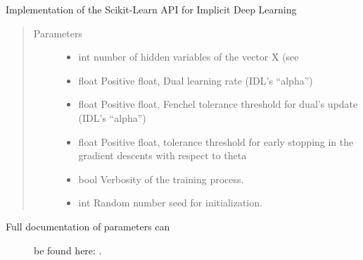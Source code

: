 \documentclass[letterpaper,10pt,english]{sphinxmanual}
\begin{document}
\begin{fulllineitems}
\label{\detokenize{sections/prediction:IDL.IDLModel}}
Implementation of the Scikit-Learn API for Implicit Deep Learning
\begin{quote}\begin{description}
\item[{Parameters}] \leavevmode\begin{itemize}
\item {} 
 \textendash{} int
number of hidden variables of the vector X (see

\item {} 
 \textendash{} float
Positive float, Dual learning rate (IDL’s “alpha”)

\item {} 
 \textendash{} float
Positive float, Fenchel tolerance threshold for dual’s update (IDL’s “alpha”)

\item {} 
 \textendash{} float
Positive float, tolerance threshold for early stopping in the gradient descents with respect to theta

\item {} 
 \textendash{} bool
Verbosity of the training process.

\item {} 
 \textendash{} int
Random number seed for initialization.

\end{itemize}

\end{description}\end{quote}
\begin{description}
\item[{Full documentation of parameters can}] \leavevmode
be found here: .


\end{description}
\end{fulllineitems}
\end{document}
